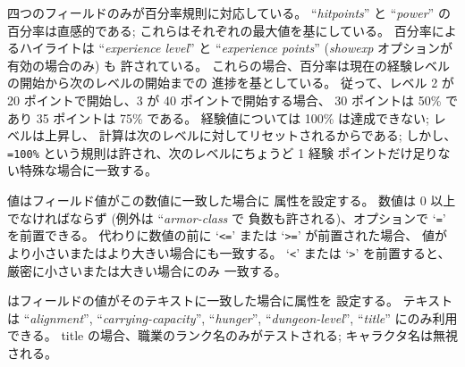 四つのフィールドのみが百分率規則に対応している。
``{\it hitpoints\/}'' と ``{\it power\/}'' の百分率は直感的である;
これらはそれぞれの最大値を基にしている。
百分率によるハイライトは ``{\it experience level\/}'' と
``{\it experience points\/}'' ({\it showexp\/} オプションが有効の場合のみ) も
許されている。
これらの場合、百分率は現在の経験レベルの開始から次のレベルの開始までの
進捗を基としている。
従って、レベル 2 が 20 ポイントで開始し、3 が 40 ポイントで開始する場合、
30 ポイントは 50\% であり 35 ポイントは 75\% である。
経験値については 100\% は達成できない; レベルは上昇し、
計算は次のレベルに対してリセットされるからである;
しかし、{\tt =100\%} という規則は許され、次のレベルにちょうど 1 経験
ポイントだけ足りない特殊な場合に一致する。
\item[{\tt absolute}] 値はフィールド値がこの数値に一致した場合に
属性を設定する。
数値は 0 以上でなければならず (例外は ``{\it armor-class\/} で
負数も許される)、オプションで `{\tt =}' を前置できる。
代わりに数値の前に `{\tt <=}' または `{\tt >=}' が前置された場合、
値がより小さいまたはより大きい場合にも一致する。
`{\tt <}' または `{\tt >}' を前置すると、厳密に小さいまたは大きい場合にのみ
一致する。
\item[{\tt text}] はフィールドの値がそのテキストに一致した場合に属性を
設定する。
テキストは ``{\it alignment\/}'',
``{\it carrying-capacity\/}'', ``{\it hunger\/}'', ``{\it dungeon-level\/}'',
``{\it title\/}'' にのみ利用できる。
title の場合、職業のランク名のみがテストされる;
キャラクタ名は無視される。
\elist


